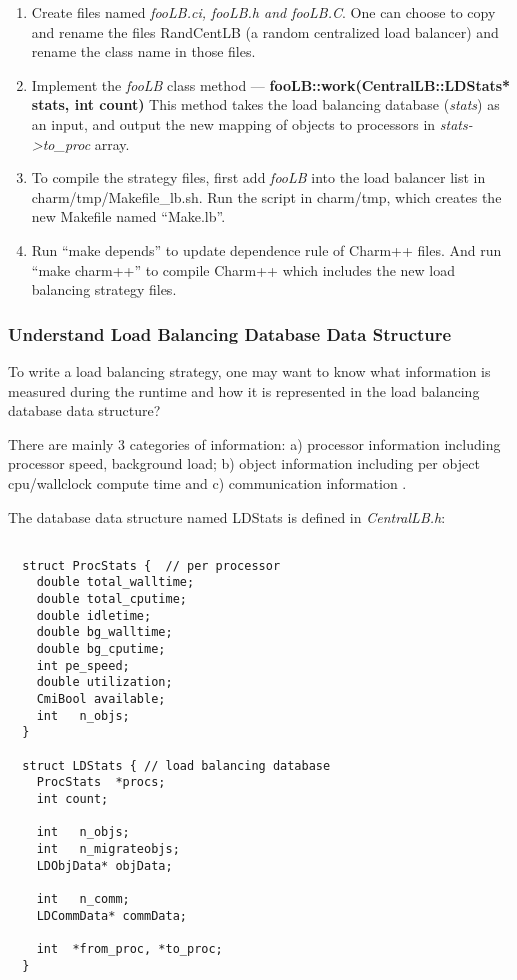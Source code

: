 \begin{enumerate}
\item Create files named {\em fooLB.ci, fooLB.h and fooLB.C}. One can choose to
copy and rename the files RandCentLB (a random centralized load balancer) and 
rename the class name in those files.

\item Implement the {\em fooLB} class method --- 
{\bf fooLB::work(CentralLB::LDStats* stats, int count)} 
This method takes the load balancing database ({\em stats}) as an input,
and output the new mapping of objects to processors in {\em stats->to\_proc} array.

\item To compile the strategy files, first add {\em fooLB} into the load 
balancer list in charm/tmp/Makefile\_lb.sh. Run the script in charm/tmp, 
which creates the new Makefile named ``Make.lb''.

\item Run ``make depends'' to update dependence rule of Charm++ files.
   And run ``make charm++'' to compile Charm++ which includes the new 
load balancing strategy files.
\end{enumerate}


\subsubsection{Understand Load Balancing Database Data Structure}

\label{lbdatabase}

To write a load balancing strategy, one may want to know 
what information is measured during the runtime and how it is represented in
the load balancing database data structure?

There are mainly 3 categories of information: a) processor information including processor speed, background load; b) object information including per object
cpu/wallclock compute time and c) communication information .

The database data structure named {\kw LDStats} is defined in {\em CentralLB.h}:

\begin{verbatim}

  struct ProcStats {  // per processor
    double total_walltime;
    double total_cputime;
    double idletime;
    double bg_walltime;
    double bg_cputime;
    int pe_speed;
    double utilization;
    CmiBool available;
    int   n_objs;
  }

  struct LDStats { // load balancing database
    ProcStats  *procs;
    int count;

    int   n_objs;
    int   n_migrateobjs;
    LDObjData* objData;

    int   n_comm;
    LDCommData* commData;

    int  *from_proc, *to_proc;
  }

\end{verbatim}

